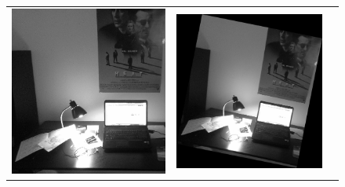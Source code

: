 \documentclass[11pt]{article} %
\begin{document}
\begin{figure}[H]
\centering
	\begin{tabular}{ccc}
			\includegraphics[scale=.25]{figures/room_l} & 
			\includegraphics[scale=.25]{figures/room_trs} &

\end{tabular}
\end{figure}
\end{document}
